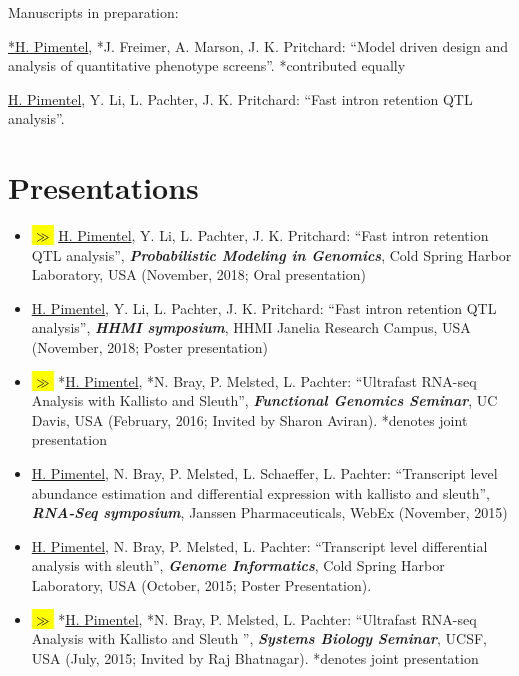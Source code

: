 \documentclass[11pt,notitlepage]{article} %
\newcommand{\hlc}[2][blue]{ {\sethlcolor{#1} \hl{#2}} }
\newcommand{\hlpub}{\hlc[Dandelion]{{\color{white}$\gg$} }}
\begin{document}
\bigskip
Manuscripts in preparation:

\bigskip
  \underline{*H. Pimentel}, *J. Freimer, A. Marson, J. K. Pritchard: ``Model driven design and analysis of quantitative phenotype screens''. *contributed equally

  \underline{H. Pimentel}, Y. Li, L. Pachter, J. K. Pritchard: ``Fast intron retention QTL analysis''.

  \bigskip
\section*{Presentations}
\medskip

\begin{itemize}
\item \hlpub \underline{H. Pimentel}, Y. Li, L. Pachter, J. K. Pritchard: ``Fast intron retention QTL analysis'', {\bf \emph{Probabilistic Modeling in Genomics}}, Cold Spring Harbor Laboratory, USA (November, 2018; Oral presentation)

\item \underline{H. Pimentel}, Y. Li, L. Pachter, J. K. Pritchard: ``Fast intron retention QTL analysis'', {\bf \emph{HHMI symposium}}, HHMI Janelia Research Campus, USA (November, 2018; Poster presentation)

\item \hlpub *\underline{H. Pimentel}, *N. Bray, P. Melsted, L. Pachter: ``Ultrafast RNA-seq Analysis with Kallisto and Sleuth'', {\bf \emph{Functional Genomics Seminar}}, UC Davis, USA (February, 2016; Invited by Sharon Aviran). *denotes joint presentation

\item \underline{H. Pimentel}, N. Bray, P. Melsted, L. Schaeffer, L. Pachter: ``Transcript level abundance estimation and differential expression with kallisto and sleuth'', {\bf \emph{RNA-Seq symposium}}, Janssen Pharmaceuticals, WebEx (November, 2015)

\item \underline{H. Pimentel}, N. Bray, P. Melsted, L. Pachter: ``Transcript level differential analysis with sleuth'', {\bf \emph{Genome Informatics}}, Cold Spring Harbor
Laboratory, USA (October, 2015; Poster Presentation).

\item \hlpub *\underline{H. Pimentel}, *N. Bray, P. Melsted, L. Pachter: ``Ultrafast RNA-seq Analysis with Kallisto and Sleuth '', {\bf \emph{Systems Biology Seminar}}, UCSF, USA (July, 2015; Invited by Raj Bhatnagar). *denotes joint presentation


\end{itemize}
\end{document}
